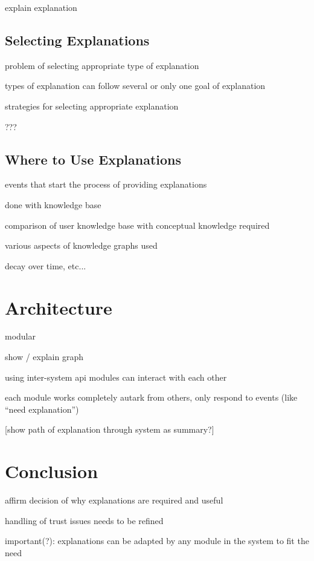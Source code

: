 \documentclass[a4paper]{article}
\begin{document}
explain explanation

\subsection{Selecting Explanations}

problem of selecting appropriate type of explanation

types of explanation can follow several or only one goal of explanation

strategies for selecting appropriate explanation

???

\subsection{Where to Use Explanations}

events that start the process of providing explanations

done with knowledge base

comparison of user knowledge base with conceptual knowledge required

various aspects of knowledge graphs used

decay over time, etc...

\section{Architecture}

modular

show / explain graph

using inter-system api modules can interact with each other

each module works completely autark from others, only respond to events (like “need explanation”)

[show path of explanation through system as summary?]

\section{Conclusion}

affirm decision of why explanations are required and useful

handling of trust issues needs to be refined

important(?): explanations can be adapted by any module in the system to fit the need
\end{document}
